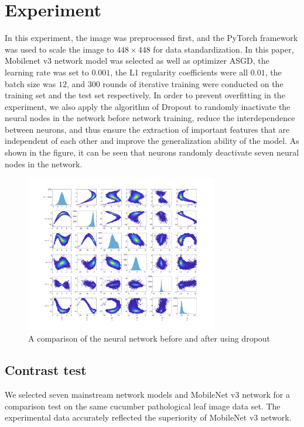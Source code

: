\documentclass[a4paper,fleqn]{cas-sc}
\begin{document}
\section{Experiment}
In this experiment, the image was preprocessed first, and the PyTorch framework was used to scale the image to $448\times448$ for data standardization. In this paper, Mobilenet v3 network model was selected as well as optimizer ASGD, the learning rate was set to $0.001$, the L1 regularity coefficients were all $0.01$, the batch size was $12$, and $300$ rounds of iterative training were conducted on the training set and the test set respectively. In order to prevent overfitting in the experiment, we also apply the algorithm of Dropout to randomly inactivate the neural nodes in the network before network training, reduce the interdependence between neurons, and thus ensure the extraction of important features that are independent of each other and improve the generalization ability of the model. As shown in the figure, it can be seen that neurons randomly deactivate seven neural nodes in the network.
\begin{figure}
\centering
\includegraphics[width=0.75\textwidth]{figs/f3.png}
\caption{ A comparison of the neural network before and after using dropout}
\label{fig:f3}
\end{figure}

\subsection{Contrast test}
We selected seven mainstream network models and MobileNet v3 network for a comparison test on the same cucumber pathological leaf image data set. The experimental data accurately reflected the superiority of MobileNet v3 network. 
\end{document}
